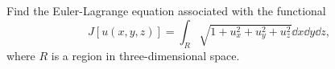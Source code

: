 \documentclass[11pt]{article}
\newcommand{\beq}{\begin{equation*}}
\newcommand{\eeq}{\end{equation*}}
\newenvironment{statement}
{
    \color{darkgray}
    \ignorespaces
}
{
}
\begin{document}
\renewcommand{\vec}[1]{\mathbf{#1}}
\newcommand{\intr}{\int_R}
\newcommand{\dR}{\partial R}
\newcommand{\dr}{\dd{x} \dd{y} \dd{z}}
\newcommand{\ux}{u_x}
\newcommand{\uy}{u_y}
\newcommand{\uz}{u_z}

\newcommand{\uxx}{u_{xx}}
\newcommand{\uyx}{u_{yx}}
\newcommand{\uzx}{u_{zx}}

\newcommand{\uxy}{u_{xy}}
\newcommand{\uyy}{u_{yy}}
\newcommand{\uzy}{u_{zy}}

\newcommand{\uxz}{u_{xz}}
\newcommand{\uyz}{u_{yz}}
\newcommand{\uzz}{u_{zz}}

\newcommand{\Ld}{\mathcal{L}}

\section{}
\begin{statement}
	Find the Euler-Lagrange equation associated with the functional
	\beq
		J[u(x, y, z)] = \intr \sqrt{1 + \ux^2 + \uy^2 + \uz^2} \dr,
	\eeq
	where $R$ is a region in three-dimensional space.
\end{statement}
\end{document}
